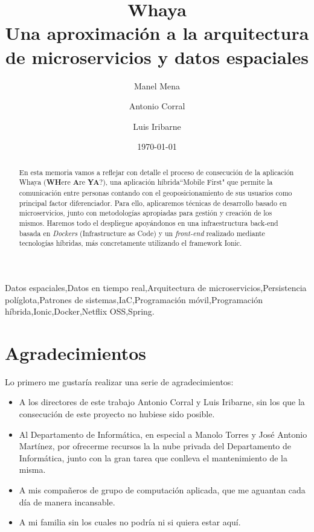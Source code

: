 \documentclass[final,2p,12pt]{elsarticle}
\begin{document}
\begin{frontmatter}


\title{\textbf{Whaya}\\Una aproximación a la arquitectura de microservicios y datos espaciales}
\author[ual]{Manel Mena}
\author[ual]{Antonio Corral}
\author[ual]{Luis Iribarne}

\address[ual]{Universidad de Almería, Ctra. Sacramento, s/n, 04120 La Cañada, Almería}
\date{\today}
\begin{abstract}
En esta memoria vamos a reflejar con detalle el proceso de consecución de la aplicación Whaya (\textbf{WH}ere \textbf{A}re \textbf{YA}?), una aplicación híbrida``Mobile First" que permite la comunicación entre personas contando con el geoposicionamiento de sus usuarios como principal factor diferenciador.
Para ello, aplicaremos técnicas de desarrollo basado en microservicios, junto con metodologías apropiadas para gestión y creación de los mismos.
Haremos todo el despliegue apoyándonos en una infraestructura back-end basada en \textit{Dockers} (Infrastructure as Code) y un \textit{front-end} realizado mediante tecnologías
híbridas, más concretamente utilizando el framework Ionic. 
\end{abstract}
\begin{keyword}
Datos espaciales\sep Datos en tiempo real\sep Arquitectura de microservicios\sep Persistencia políglota\sep Patrones de sistemas\sep IaC\sep Programación móvil\sep Programación híbrida\sep Ionic\sep Docker\sep Netflix OSS\sep Spring.
\end{keyword}

\end{frontmatter}
\newpage
\section*{Agradecimientos}
\noindent
Lo primero me gustaría realizar una serie de agradecimientos:
\begin{itemize}
    \item A los directores de este trabajo Antonio Corral y Luis Iribarne, sin los que la consecución de este proyecto no hubiese sido posible.
    \item Al Departamento de Informática, en especial a Manolo Torres y José Antonio Martínez, por ofrecerme recursos la la nube privada del Departamento de Informática, junto con la gran tarea que conlleva el mantenimiento de la misma.
    \item A mis compañeros de grupo de computación aplicada, que me aguantan cada día de manera incansable.
    \item A mi familia sin los cuales no podría ni si quiera estar aquí.  
\end{itemize} 
\newpage
\tableofcontents
\newpage
\listoffigures
\newpage
\lstlistoflistings
\newpage
\end{document}

